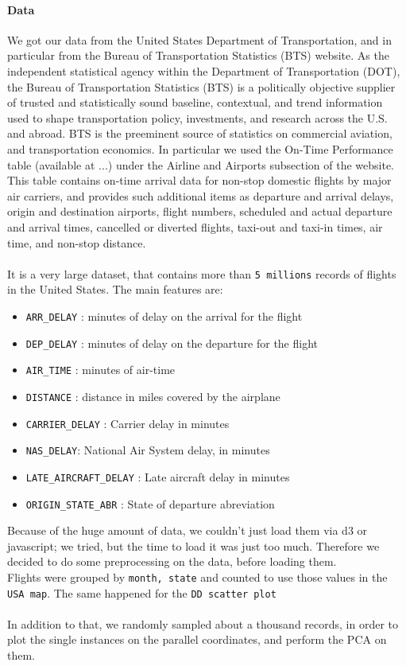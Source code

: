 \documentclass[a4paper, 12pt]{article}
\begin{document}
\paragraph*{Data}
We got our data from the United States Department of Transportation, and in particular from the 
Bureau of Transportation Statistics (BTS) website. As the independent statistical agency within the
Department of Transportation (DOT), the Bureau of Transportation Statistics (BTS) is a politically
objective supplier of trusted and statistically sound baseline, contextual, and trend information used
to shape transportation policy, investments, and research across the U.S. and abroad. BTS is the
preeminent source of statistics on commercial aviation, and transportation economics.
In particular we used the On-Time Performance table (available at ...) under the Airline and Airports
subsection of the website. This table contains on-time arrival data for non-stop domestic flights by
major air carriers, and provides such additional items as departure and arrival delays, origin and
destination airports, flight numbers, scheduled and actual departure and arrival times, cancelled or
diverted flights, taxi-out and taxi-in times, air time, and non-stop distance.\\ \\
It is a very large dataset, that contains more than \texttt{5 millions} records of flights in the United States. The main features are:
\begin{itemize}
	\item \texttt{ARR\_DELAY} : minutes of delay on the arrival for the flight 
	\item \texttt{DEP\_DELAY} : minutes of delay on the departure for the flight
	\item \texttt{AIR\_TIME} : minutes of air-time
\item \texttt{DISTANCE} : distance in miles covered by the airplane
\item \texttt{CARRIER\_DELAY} : Carrier delay in minutes  
\item \texttt{NAS\_DELAY}: National Air System delay, in minutes
\item \texttt{LATE\_AIRCRAFT\_DELAY} : Late aircraft delay in minutes
\item \texttt{ORIGIN\_STATE\_ABR} : State of departure abreviation
\end{itemize}
Because of the huge amount of data, we couldn't just load them via d3 or javascript; we tried, but the time to load it was just too much. Therefore we decided to do some preprocessing on the data, before loading them.\\
Flights were grouped by \texttt{month, state} and counted to use those values in the \texttt{USA map}. The same happened for the \texttt{DD scatter plot}\\ \\
In addition to that, we randomly sampled about a thousand records, in order to plot the single instances on the parallel coordinates, and perform the PCA on them.
\end{document}
